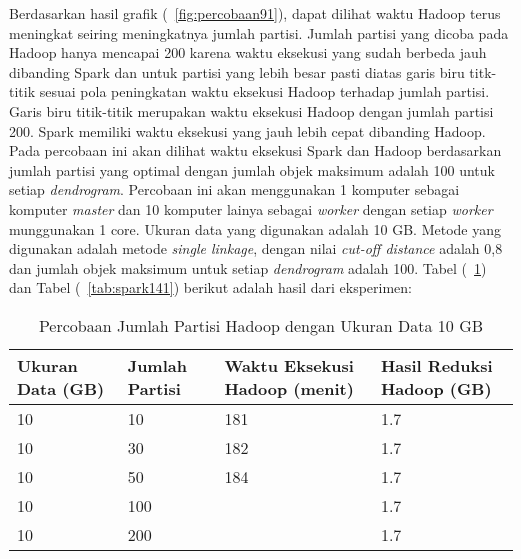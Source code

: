 Berdasarkan hasil grafik (~\ref{fig:percobaan91}), dapat dilihat waktu Hadoop terus meningkat seiring meningkatnya jumlah partisi. Jumlah partisi yang dicoba pada Hadoop hanya mencapai 200 karena waktu eksekusi yang sudah berbeda jauh dibanding Spark dan untuk partisi yang lebih besar pasti diatas garis biru titk-titik sesuai pola peningkatan waktu eksekusi Hadoop terhadap jumlah partisi. Garis biru titik-titik merupakan waktu eksekusi Hadoop dengan jumlah partisi 200. Spark memiliki waktu eksekusi yang jauh lebih cepat dibanding Hadoop.  \\



Pada percobaan ini akan dilihat waktu eksekusi Spark dan Hadoop berdasarkan jumlah partisi yang optimal dengan jumlah objek maksimum adalah 100 untuk setiap \textit{dendrogram}. Percobaan ini akan menggunakan 1 komputer sebagai komputer \textit{master} dan 10 komputer lainya sebagai \textit{worker} dengan setiap \textit{worker} munggunakan 1 core. Ukuran data yang digunakan adalah 10 GB. Metode yang digunakan adalah metode \textit{single linkage}, dengan nilai \textit{cut-off distance} adalah 0,8 dan jumlah objek maksimum untuk setiap \textit{dendrogram} adalah 100. Tabel (~\ref{tab:spark131}) dan Tabel (~\ref{tab:spark141}) berikut adalah hasil dari eksperimen:





\begin{table}[H] 
	\centering 
	\caption{Percobaan Jumlah Partisi Hadoop dengan Ukuran Data 10 GB}
	\label{tab:spark131}
	\begin{tabular}{|p{3cm}|p{3cm}|p{4cm}|p{4cm}|}
\hline
Ukuran Data (GB) & Jumlah Partisi &  Waktu Eksekusi Hadoop (menit) & Hasil Reduksi Hadoop (GB)\\
\hline
10 & 10 & 181  & 1.7  \\
\hline
10 & 30 & 182  & 1.7  \\
\hline
10 & 50 & 184  & 1.7   \\
\hline
10 & 100 &   & 1.7   \\
\hline
10 & 200 &   & 1.7   \\
\hline


\hline

	\end{tabular} 
\end{table}




